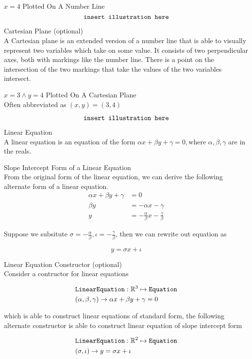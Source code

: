 \documentclass{book}
\begin{document}
  {\example $x = 4$ Plotted On A Number Line\\
    $$\text{\texttt{insert illustration here}}$$
  }

  {\remark Cartesian Plane (optional) \\
    A Cartesian plane is an extended version of a number line that is able to visually represent two variables which take on some value. It consists of two perpendicular axes, both with markings like the number line. There is a point on the intersection of the two markings that take the values of the two variables intersect.\\
  }

  {\example $x = 3 \land y = 4$ Plotted On A Cartesian Plane \\
    Often abbreviated as $(x, y) = (3, 4)$

    $$\text{\texttt{insert illustration here}}$$
  }

  {\remark Linear Equation \\
    A linear equation is an equation of the form $\alpha x + \beta y + \gamma = 0, \text{where } \alpha, \beta, \gamma$ are in the reals.\\
  }

  {\remark Slope Intercept Form of a Linear Equation \\
    From the original form of the linear equation, we can derive the following alternate form of a linear equation.
    \begin{align*}
      \alpha x + \beta y + \gamma & = 0\\
      \beta y & = - \alpha x - \gamma\\
      y & = -\frac{\alpha}{\beta} x - \frac{\gamma}{\beta}
    \end{align*}

    Suppose we subsitute $\sigma = - \frac{\alpha}{\beta}, \iota = - \frac{\gamma}{\beta}$, then we can rewrite out equation as

    $$y = \sigma x + \iota$$
  }

  {\remark Linear Equation Constructor (optional) \\
    Consider a contructor for linear equations

    \begin{align*}
      & \text{\texttt{LinearEquation}}: \mathbb{R}^3 \mapsto \text{\texttt{Equation}}\\
      & (\alpha, \beta, \gamma) \to \alpha x + \beta y + \gamma = 0
    \end{align*}

    which is able to construct linear equations of standard form, the following alternate constructor is able to construct linear equation of slope intercept form

    \begin{align*}
      & \text{\texttt{LinearEquation}}: \mathbb{R}^2 \mapsto \text{\texttt{Equation}}\\
      & (\sigma, \iota) \to y = \sigma x + \iota
    \end{align*}
  }
\end{document}
